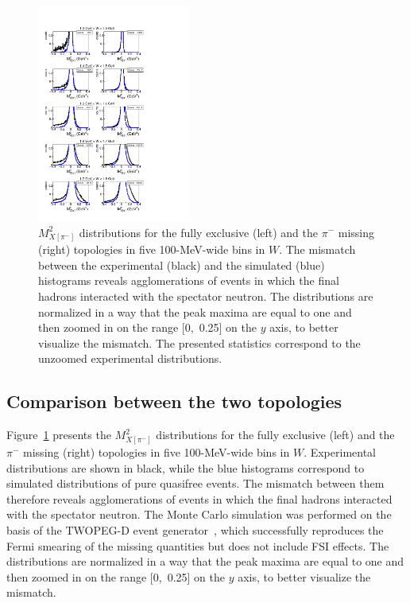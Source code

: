 \documentclass[prc,twocolumn,superscriptaddress,showpacs,amssymb,amsmath,amsfonts,aps,nofootinbib]{revtex4-1}
\begin{document}
\begin{figure}[htp]
\begin{center}
\includegraphics[width=0.45\textwidth]{pictures/fsi/top_comp2.pdf}
\caption{\small $M^{2}_{X[\pi^{-}]}$ distributions for the fully exclusive (left) and the $\pi^{-}$ missing (right) topologies in five 100-MeV-wide bins in $W$. The mismatch between the experimental (black) and the simulated (blue) histograms reveals agglomerations of events in which the final hadrons interacted with the spectator neutron. The distributions are normalized in a way that the peak maxima are equal to one and then zoomed in on the range [0,~0.25] on the $y$ axis, to better visualize the mismatch. The presented statistics correspond to the unzoomed experimental distributions.
} \label{fig:top_comp}
\end{center}
\end{figure}


\subsection{Comparison between the two topologies}
\label{sect:fsi_top_comp}


Figure~\ref{fig:top_comp} presents the $M^{2}_{X[\pi^{-}]}$ distributions for the fully exclusive (left) and the $\pi^{-}$ missing (right) topologies in five 100-MeV-wide bins in $W$. Experimental distributions are shown in black, while the blue histograms correspond to simulated distributions of pure quasifree events. The mismatch between them therefore reveals agglomerations of events in which the final hadrons interacted with the spectator neutron. The Monte Carlo simulation was performed on the basis of the TWOPEG-D event generator~\cite{twopeg-d}, which successfully reproduces the Fermi smearing of the missing quantities but does not include FSI effects. The distributions are normalized in a way that the peak maxima are equal to one and then zoomed in on the range [0,~0.25] on the $y$ axis, to better visualize the mismatch.
\end{document}
